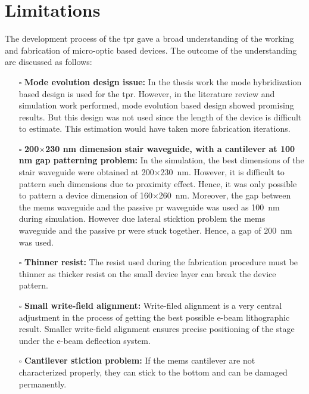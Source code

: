 \documentclass[../report.tex]{subfiles}
\begin{document}
	\section{Limitations}
The development process of the \gls{tpr} gave a broad understanding of the working and fabrication of micro-optic based devices. The outcome of the understanding are discussed as follows:
\begin{itemize}	
	\item[$\square$] \textbf{Mode evolution design issue:} In the thesis work the mode hybridization based design is used for the \gls{tpr}. However, in the literature review and simulation work performed, mode evolution based design showed promising results. But this design was not used since the length of the device is difficult to estimate. This estimation would have taken more fabrication iterations. 
	
	\item[$\square$] \textbf{200$\times$230 nm dimension stair waveguide, with a cantilever at 100 nm gap patterning problem:} In the simulation, the best dimensions of the stair waveguide were obtained at 200$\times$\SI{230}{\nano\meter}. However, it is difficult to pattern such dimensions due to proximity effect. Hence, it was only possible to pattern a device dimension of 160$\times$\SI{260}{\nano\meter}. Moreover, the gap between the \gls{mems} waveguide and the passive \gls{pr} waveguide was used as \SI{100}{\nano\meter} during simulation. However due lateral sticktion problem the \gls{mems} waveguide and the passive \gls{pr} were stuck together. Hence, a gap of \SI{200}{\nano\meter} was used.
	
	\item[$\square$] \textbf{Thinner resist:} The resist used during the fabrication procedure must be thinner as thicker resist on the small device layer can break the device pattern.
	
	\item[$\square$] \textbf{Small write-field alignment:} Write-filed alignment is a very central adjustment in the process of getting the best possible e-beam lithographic result. Smaller write-field alignment ensures precise positioning of the stage under the e-beam deflection system.
	
	\item[$\square$] \textbf{Cantilever stiction problem:} If the \gls{mems} cantilever are not characterized properly, they can stick to the bottom and can be damaged permanently.
	

\end{itemize}
\end{document}
